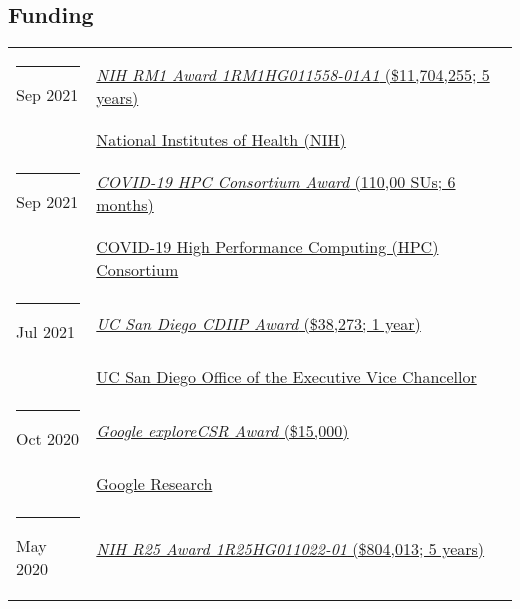 \documentclass[margin,line]{res}
\begin{document}
\begin{resume}
\section{\sc Funding}
\begin{longtable}{@{}p{0.7in}p{4in}}
\hspace*{-4mm} \rule{-1mm}{5mm} Sep 2021 & \href{https://reporter.nih.gov/project-details/10307040}{\textit{NIH RM1 Award 1RM1HG011558-01A1} (\$11,704,255; 5 years)}\\*
\hspace*{-4mm} \hspace*{-4mm} & \hspace{4mm} \href{https://nih.gov}{National Institutes of Health (NIH)}\\
\hspace*{-4mm} \rule{-1mm}{5mm} Sep 2021 & \href{https://www.xsede.org/covid19-hpc-consortium}{\textit{COVID-19 HPC Consortium Award} (110,00 SUs; 6 months)}\\*
\hspace*{-4mm} \hspace*{-4mm} & \hspace{4mm} \href{https://covid19-hpc-consortium.org/}{COVID-19 High Performance Computing (HPC) Consortium}\\
\hspace*{-4mm} \rule{-1mm}{5mm} Jul 2021 & \href{https://academicaffairs.ucsd.edu/evc/cdiip.html}{\textit{UC San Diego CDIIP Award} (\$38,273; 1 year)}\\*
\hspace*{-4mm} \hspace*{-4mm} & \hspace{4mm} \href{https://academicaffairs.ucsd.edu/evc/cdiip.html}{UC San Diego Office of the Executive Vice Chancellor}\\
\hspace*{-4mm} \rule{-1mm}{5mm} Oct 2020 & \href{https://research.google/outreach/explore-csr/recipients/?category=2020}{\textit{Google exploreCSR Award} (\$15,000)}\\*
\hspace*{-4mm} \hspace*{-4mm} & \hspace{4mm} \href{https://research.google/}{Google Research}\\
\hspace*{-4mm} \rule{-1mm}{5mm} May 2020 & \href{https://reporter.nih.gov/project-details/9935824}{\textit{NIH R25 Award 1R25HG011022-01} (\$804,013; 5 years)}\\*

\end{longtable}
\end{resume}
\end{document}
